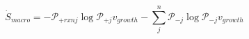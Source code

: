\begin{equation}
\dot S_{macro} = -\mathcal P_{+rxnj}\log\mathcal P_{+j}v_{growth} -\sum_j^n\mathcal P_{-j}\log\mathcal P_{-j} v_{growth}
\end{equation}